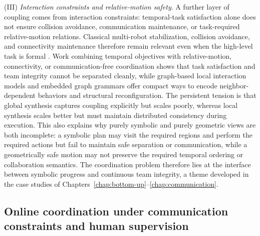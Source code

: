  (III) \emph{Interaction constraints and relative-motion safety}. A further layer
of coupling comes from interaction constraints: temporal-task satisfaction alone
does not ensure collision avoidance, communication maintenance, or
task-required relative-motion relations. Classical multi-robot stabilization,
collision avoidance, and connectivity maintenance therefore remain relevant even
when the high-level task is formal
\citep{dimarogonas2006feedback, zavlanos2011graph, ji2007distributed}. Work
combining temporal objectives with relative-motion, connectivity, or
communication-free coordination
\citep{guo2014controlling, guo2014cooperative, guo2015hybrid,
guo2015communicationfree} shows that task satisfaction and team integrity
cannot be separated cleanly, while graph-based local interaction models and
embedded graph grammars
\citep{mcnew2006locally, smith2009multi, pickem2013complete, guo2016graphgrammar}
offer compact ways to encode neighbor-dependent behaviors and structural
reconfiguration. The persistent tension is that global synthesis captures
coupling explicitly but scales poorly, whereas local synthesis scales better but
must maintain distributed consistency during execution. This also explains why
purely symbolic and purely geometric views are both incomplete: a symbolic plan
may visit the required regions and perform the required actions but fail to
maintain safe separation or communication, while a geometrically safe motion may
not preserve the required temporal ordering or collaboration semantics. The
coordination problem therefore lies at the interface between symbolic progress
and continuous team integrity, a theme developed in the case studies of
Chapters~\ref{chap:bottom-up}--\ref{chap:communication}.


\subsection{Online coordination under communication constraints and human supervision}
\label{sec:ch01:rw:online}

